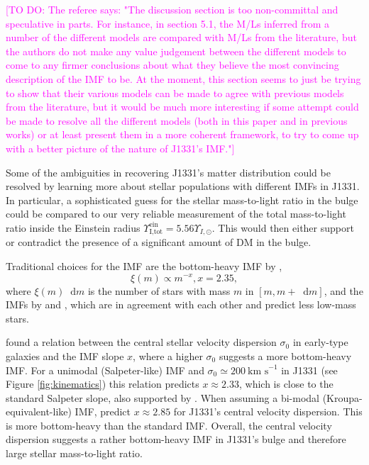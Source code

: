 \documentclass[useAMS,usenatbib]{mnras}
\newcommand*\diff{\mathop{}\!\mathrm{d}}
\newcommand{\Wilma}[1]{\textcolor{Magenta}{#1}}
\begin{document}
\Wilma{[TO DO: The referee says: "The discussion section is too non-committal and speculative in parts. For instance,
in section 5.1, the M/Ls inferred from a number of the different models are compared
with M/Ls from the literature, but the authors do not make any value judgement
between the different models to come to any firmer conclusions about what they
believe the most convincing description of the IMF to be. At the moment, this
section seems to just be trying to show that their various models can be made to
agree with previous models from the literature, but it would be much more
interesting if some attempt could be made to resolve all the different models (both
in this paper and in previous works) or at least present them in a more coherent
framework, to try to come up with a better picture of the nature of J1331's IMF."]}

Some of the ambiguities in recovering J1331's matter distribution could be resolved by learning more about stellar populations with different IMFs in J1331. In particular, a sophisticated guess for the stellar mass-to-light ratio in the bulge could be compared to our very reliable measurement of the total mass-to-light ratio inside the Einstein radius $\Upsilon_\text{I,tot}^\text{ein} = 5.56 \Upsilon_{I,\odot}$. This would then either support or contradict the presence of a significant amount of DM in the bulge.

Traditional choices for the IMF are the bottom-heavy IMF by \citet{Salpeter1955},
$$\xi(m) \propto m^{-x}, x=2.35,$$
where $\xi(m) \diff m$ is the number of stars with mass $m$ in $[m,m+\diff m]$, and the IMFs by \citet{2002Sci...295...82K} and \citet{Chabrier2003}, which are in agreement with each other and predict less low-mass stars.

\citet{Ferreras} found a relation between the central stellar velocity dispersion $\sigma_0$ in early-type galaxies and the IMF slope $x$, where a higher $\sigma_0$ suggests a more bottom-heavy IMF. For a unimodal (Salpeter-like) IMF and $\sigma_0 \simeq 200~\text{km s}^{-1}$ in J1331 (see Figure \ref{fig:kinematics}) this relation predicts $x \approx 2.33$, which is close to the standard Salpeter slope, also supported by \citet{2014MNRAS.438.1483S}. When assuming a bi-modal (Kroupa-equivalent-like) IMF, \citet{Ferreras} predict $x \approx 2.85$ for J1331's central velocity dispersion. This is more bottom-heavy than the standard \citet{2002Sci...295...82K} IMF. Overall, the central velocity dispersion suggests a rather bottom-heavy IMF in J1331's bulge and therefore large stellar mass-to-light ratio. 
\end{document}
